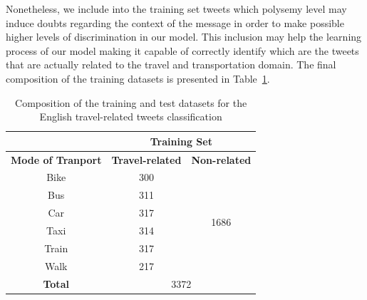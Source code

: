 Nonetheless, we include into the training set tweets which polysemy level may induce doubts regarding the context of the message in order to make possible higher levels of discrimination in our model. This inclusion may help the learning process of our model making it capable of correctly identify which are the tweets that are actually related to the travel and transportation domain.
The final composition of the training datasets is presented in Table~\ref{tab:new_york_first_dataset}.

\begin{table}[!tp]
	\centering
	\caption[English-speaking tweets datasets]{Composition of the training and test datasets for the English travel-related tweets classification}
	\label{tab:new_york_first_dataset}
	\begin{tabular}{c|c|c|}
		\cline{2-3}
		\textbf{}                                       & \multicolumn{2}{c|}{\textbf{Training Set}}                          \\ \hline
		\multicolumn{1}{|c|}{\textbf{Mode of Tranport}} & \textbf{Travel-related} & \multicolumn{1}{l|}{\textbf{Non-related}} \\ \hline
		\multicolumn{1}{|c|}{Bike}                      & 300                     & \multirow{6}{*}{1686}                     \\
		\multicolumn{1}{|c|}{Bus}                       & 311                     &                                           \\
		\multicolumn{1}{|c|}{Car}                       & 317                     &                                           \\
		\multicolumn{1}{|c|}{Taxi}                      & 314                     &                                           \\
		\multicolumn{1}{|c|}{Train}                     & 317                     &                                           \\
		\multicolumn{1}{|c|}{Walk}                      & 217                     &                                           \\ \hline
		\multicolumn{1}{|c|}{\textbf{Total}}            & \multicolumn{2}{c|}{3372}                                           \\ \hline
	\end{tabular}
\end{table}

